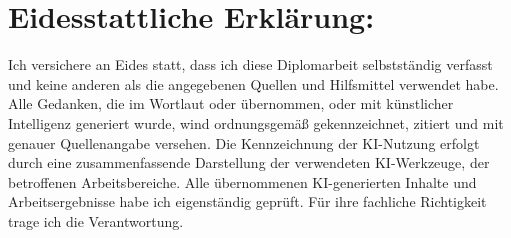 \chapter*{Eidesstattliche Erklärung:}
\thispagestyle{empty}
Ich versichere an Eides statt, dass ich diese Diplomarbeit selbstständig verfasst und keine anderen als die angegebenen Quellen und Hilfsmittel verwendet habe. Alle Gedanken, die im Wortlaut oder übernommen, oder mit künstlicher Intelligenz generiert wurde, wind ordnungsgemäß gekennzeichnet, zitiert und mit genauer Quellenangabe versehen. Die Kennzeichnung der KI-Nutzung erfolgt durch eine zusammenfassende Darstellung der verwendeten KI-Werkzeuge, der betroffenen Arbeitsbereiche. Alle übernommenen KI-generierten Inhalte und Arbeitsergebnisse habe ich eigenständig geprüft. Für ihre fachliche Richtigkeit trage ich die Verantwortung.


\vspace{5cm}
\begin{flushright}
\underline{\hspace{5cm}}\\
\\
\vspace{2cm}
\makebox[5cm]{\hrulefill}\\
\end{flushright}
\newpage
